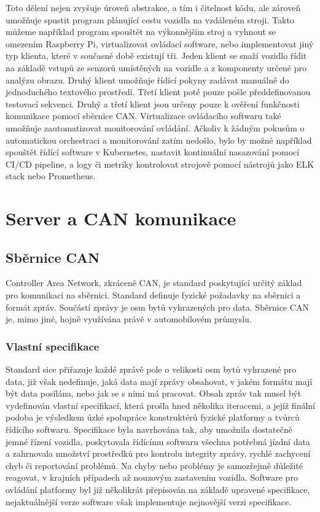 \documentclass[czech, bachelor]{diploma}
\begin{document}
Toto dělení nejen zvyšuje úroveň abstrakce, a tím i čitelnost kódu, ale zároveň umožňuje spustit program plánující
cestu vozidla na vzdáleném stroji. Takto můžeme například program spouštět na výkonnějším stroj a vyhnout se omezením
Raspberry Pi, virtualizovat ovládací software, nebo implementovat jiný typ klienta, které v současné době existují tři.
Jeden klient se snaží vozidlo řídit na základě vstupů ze senzorů umístěných na vozidle a z komponenty určené pro analýzu obrazu.
Druhý klient umožňuje řídící pokyny zadávat manuálně do jednoduchého textového prostředí. Třetí klient poté pouze pošle
předdefinovanou testovací sekvenci. Druhý a třetí klient jsou určeny pouze k ověření funkčnosti komunikace pomocí sběrnice CAN.
Virtualizace ovládacího softwaru také umožňuje zautomatizovat monitorování ovládání. Ačkoliv k žádným pokusům o automatickou
orchestraci a monitorování zatím nedošlo, bylo by možné například spouštět řídící software v Kubernetes, nastavit kontinuální
nasazování pomocí CI/CD pipeline, a logy či metriky kontrolovat strojově pomocí nástrojů jako ELK stack nebo Prometheus.

\chapter{Server a CAN komunikace}

\section{Sběrnice CAN}

Controller Area Network, zkráceně CAN, je standard poskytující určitý základ pro komunikaci na sběrnici. Standard definuje
fyzické požadavky na sběrnici a formát zpráv. Součástí zprávy je osm bytů vyhrazených pro data. Sběrnice CAN je, mimo jiné, hojně
využívána právě v automobilovém průmyslu.

\subsection{Vlastní specifikace}
Standard sice přiřazuje každé zprávě pole o velikosti osm bytů vyhrazené pro data, již však nedefinuje, jaká data mají zprávy
obsahovat, v jakém formátu mají být data posílána, nebo jak se s nimi má pracovat. Obsah zpráv tak musel být vydefinován vlastní
specifikací, která prošla hned několika iteracemi, a jejíž finální podoba je výsledkem úzké spolupráce konstruktérů fyzické
platformy a tvůrců řídícího softwaru. Specifikace byla navrhována tak, aby umožnila dostatečně jemné řízení vozidla, poskytovala
řídícímu softwaru všechna potřebná jízdní data a zahrnovala množství prostředků pro kontrolu integrity zprávy, rychlé zachycení
chyb či reportování problémů. Na chyby nebo problémy je samozřejmě důležité reagovat, v krajních případech až nouzovým zastavením
vozidla. Software pro ovládání platformy byl již několikrát přepisován na základě upravené specifikace, nejaktuálnější verze
software však implementuje nejnovější verzi specifikace.
\end{document}
